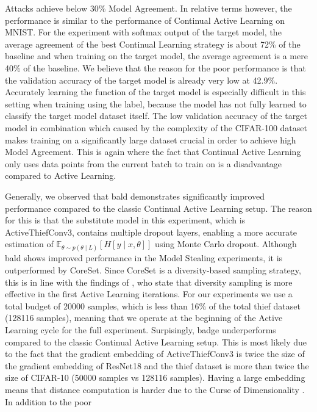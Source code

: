 Attacks achieve below 30\% Model Agreement. In relative terms however, the performance is similar to the performance of Continual Active Learning on MNIST. For the
experiment with softmax output of the target model, the average agreement of the best Continual Learning strategy is about 72\% of the baseline and when training
on the target model, the average agreement is a mere 40\% of the baseline. We believe that the reason for the poor performance is that the validation accuracy of
the target model is already very low at 42.9\%. Accurately learning the function of the target model is especially difficult in this setting when training using
the label, because the model has not fully learned to classify the target model dataset itself. The low validation accuracy of the target model in combination which
caused by the complexity of the CIFAR-100 dataset makes training on a significantly large dataset crucial in order to achieve high Model Agreement. This is again
where the fact that Continual Active Learning only uses data points from the current batch to train on is a disadvantage compared to Active Learning. \par
Generally, we observed that \gls{bald} demonstrates significantly improved performance compared to the classic Continual Active Learning setup. The reason for this
is that the substitute model in this experiment, which is ActiveThiefConv3, contains multiple dropout layers, enabling a more accurate estimation of 
$\mathbb{E}_{\theta \sim p(\theta \mid L)} [H[y \mid x, \theta]]$ using Monte Carlo dropout. Although \gls{bald} shows improved performance in the Model Stealing
experiments, it is outperformed by CoreSet. Since CoreSet is a diversity-based sampling strategy, this is in line with the findings of \cite{ash2019deep}, who
state that diversity sampling is more effective in the first Active Learning iterations. For our experiments we use a total budget of 20000 samples, which is less
than 16\% of the total thief dataset (128116 samples), meaning that we operate at the beginning of the Active Learning cycle for the full experiment. Surpisingly,
\gls{badge} underperforms compared to the classic Continual Active Learning setup. This is most likely due to the fact that the gradient embedding of
ActiveThiefConv3 is twice the size of the gradient embedding of ResNet18 and the thief dataset is more than twice the size of CIFAR-10 (50000 samples vs 128116
samples). Having a large embedding means that distance computation is harder due to the Curse of Dimensionality \cite{koppen2000curse}. In addition to the poor
